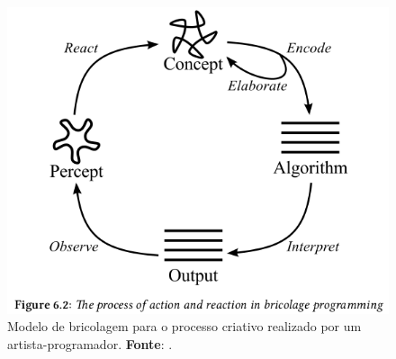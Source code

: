 
 \begin{figure}[h]
  \centering
  \includegraphics[scale=0.5]{imagens/processo_criativo.png}
  \caption{Modelo de bricolagem para o processo criativo realizado por um artista-programador. \textbf{Fonte}: . }
  \label{fig:processo_criativo}
\end{figure}

